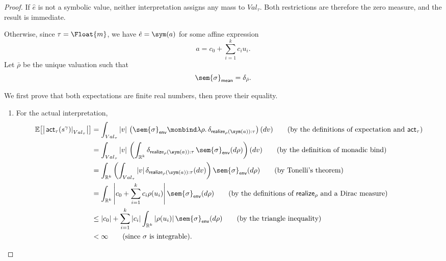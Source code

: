 \begin{proof}
  If $\hat e$ is not a symbolic value, neither interpretation assigns any mass to
  $Val_\tau$. Both restrictions are therefore the zero measure, and
  the result is immediate.

  Otherwise, since $\tau=\Float{m}$, we have $\hat e=\sym(a)$ for
  some affine expression
  \[
    a=c_0+\sum_{i=1}^k c_i u_i.
  \]
  Let $\bar\rho$ be the unique valuation such that
  \[
    \sem{\sigma}_{\mathsf{mean}}=\delta_{\bar\rho}.
  \]

  We first prove that both expectations are finite real numbers, then prove
  their equality.

  \begin{enumerate}
    \item
    For the actual interpretation,
    \begin{align}
      \mathbb E\!\left[
        \left|
          \left.\mathsf{act}_\tau(s^\gamma)\right|_{Val_\tau}
        \right|
      \right]
      &=
      \int_{Val_\tau}
        |v|\,
        \left(
          \sem{\sigma}_{\mathsf{env}}
          \monbind
          \lambda\rho.\,
          \delta_{\mathsf{realize}_\rho(\sym(a)):\tau}
        \right)(dv)
      \tag{\text{by the definitions of expectation and $\mathsf{act}_\tau$}}
      \\
      &=
      \int_{Val_\tau}
        |v|\,
        \left(
          \int_{\mathbb R^k}
            \delta_{\mathsf{realize}_\rho(\sym(a)):\tau}
            \,\sem{\sigma}_{\mathsf{env}}(d\rho)
        \right)(dv)
      \tag{\text{by the definition of monadic bind}}
      \\
      &=
      \int_{\mathbb R^k}
        \left(
          \int_{Val_\tau}
            |v|\,
            \delta_{\mathsf{realize}_\rho(\sym(a)):\tau}(dv)
        \right)
        \sem{\sigma}_{\mathsf{env}}(d\rho)
      \tag{\text{by Tonelli's theorem}}
      \\
      &=
      \int_{\mathbb R^k}
        \left|
          c_0+\sum_{i=1}^k c_i\rho(u_i)
        \right|
        \sem{\sigma}_{\mathsf{env}}(d\rho)
      \tag{\text{by the definitions of $\mathsf{realize}_\rho$ and a Dirac measure}}
      \\
      &\leq
      |c_0|
      +
      \sum_{i=1}^k
        |c_i|
        \int_{\mathbb R^k}
          |\rho(u_i)|\,
          \sem{\sigma}_{\mathsf{env}}(d\rho)
      \tag{\text{by the triangle inequality}}
      \\
      &<
      \infty
      \tag{\text{since $\sigma$ is integrable}}.
    \end{align}


\end{enumerate}
\end{proof}
